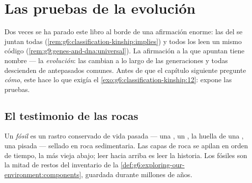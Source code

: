 \chapter{Las pruebas de la evolución}\label{ch:g9:evidence-of-evolution}

Dos veces se ha parado este libro al borde de una afirmación enorme:
las  del  se juntan todas
(\cref{rem:g6:classification-kinship:implies}) y todos los 
leen un mismo código (\cref{rem:g9:genes-and-dna:universal}). La
afirmación a la que apuntan tiene nombre --- la \emph{evolución}: las
 cambian a lo largo de las generaciones y todas descienden de
antepasados comunes. Antes de que el capítulo siguiente pregunte
\emph{cómo}, este hace lo que exigía el
\cref{exo:g6:classification-kinship:12}: expone las pruebas.

\section{El testimonio de las rocas}

\begin{definition}\label{def:g9:evidence-of-evolution:fossils}
Un \emph{fósil} es un rastro conservado de vida pasada ---
una , un , la huella de una , una pisada --- sellado en
roca sedimentaria. Las capas de roca se apilan en orden de tiempo, la
más vieja abajo; leer hacia arriba es leer la historia. Los fósiles son
la mitad de restos del inventario de la
\cref{def:g6:exploring-our-environment:components}, guardada durante
millones de años.
\end{definition}

